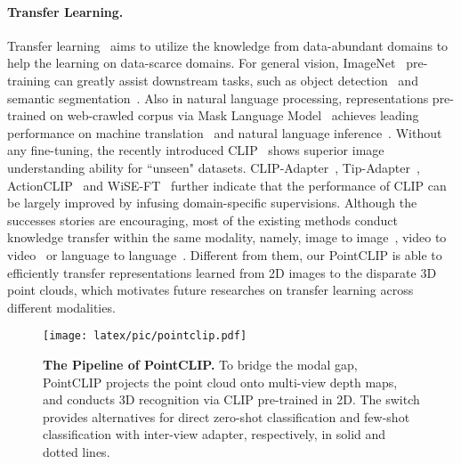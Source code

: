 \documentclass[10pt,twocolumn,letterpaper]{article}
\begin{document}
\vspace*{-8pt}
\paragraph{Transfer Learning.}
Transfer learning~\cite{deng2009imagenet,zamir2018taskonomy} aims to utilize the knowledge from data-abundant domains to help the learning on data-scarce domains. For general vision, ImageNet~\cite{deng2009imagenet} pre-training can greatly assist downstream tasks, such as object detection~\cite{ren2015faster,carion2020end,gao2021fast} and semantic segmentation~\cite{long2015fully}. Also in natural language processing, representations pre-trained on web-crawled corpus via Mask Language Model~\cite{devlin2018bert} achieves leading performance on machine translation~\cite{mccann2017learned} and natural language inference~\cite{conneau2017supervised}.
Without any fine-tuning, the recently introduced CLIP~\cite{radford2021learning} shows superior image understanding ability for ``unseen" datasets. CLIP-Adapter~\cite{gao2021clip}, Tip-Adapter~\cite{zhang2021tip}, ActionCLIP~\cite{wang2021actionclip} and WiSE-FT~\cite{wortsman2021robust} further indicate that the performance of CLIP can be largely improved by infusing domain-specific supervisions. Although the successes stories are encouraging, most of the existing methods conduct knowledge transfer within the same modality, namely, image to image~\cite{deng2009imagenet}, video to video~\cite{carreira2017quo} or language to language~\cite{devlin2018bert}. Different from them, our PointCLIP is able to efficiently transfer representations learned from 2D images to the disparate 3D point clouds, which motivates future researches on transfer learning across different modalities. 






\begin{figure*}[ht!]
  \centering
    \texttt{[image: latex/pic/pointclip.pdf]}
   \caption{\textbf{The Pipeline of PointCLIP.} To bridge the modal gap, PointCLIP projects the point cloud onto multi-view depth maps, and conducts 3D recognition via CLIP pre-trained in 2D. The switch provides alternatives for direct zero-shot classification and few-shot classification with inter-view adapter, respectively, in solid and dotted lines.}
    \label{fig:cache_model}
    \vspace{-0.3cm}
\end{figure*}

\vspace*{-8pt}
\end{document}
